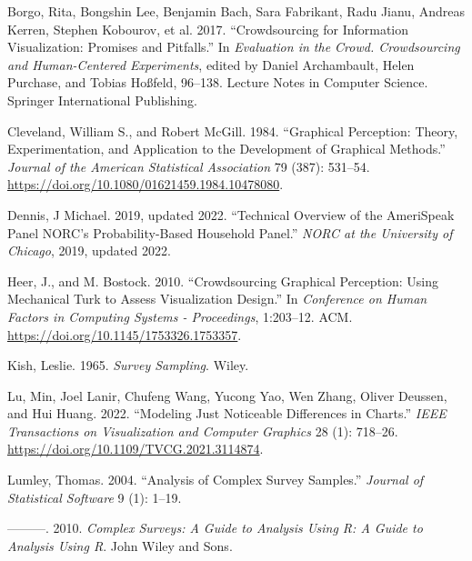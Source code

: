 \documentclass[
]{jds}
\newlength{\cslhangindent}
\newlength{\cslentryspacingunit} %
\newenvironment{CSLReferences}[2] %
 {%
  \setlength{\parindent}{0pt}
  \ifodd #1
  \let\oldpar\par
  \def\par{\hangindent=\cslhangindent\oldpar}
  \fi
  \setlength{\parskip}{#2\cslentryspacingunit}
 }%
 {}
\begin{document}
\hypertarget{refs}{}
\begin{CSLReferences}{1}{0}
\leavevmode{}%
Borgo, Rita, Bongshin Lee, Benjamin Bach, Sara Fabrikant, Radu Jianu,
Andreas Kerren, Stephen Kobourov, et al. 2017. {``Crowdsourcing for
{Information Visualization}: {Promises} and {Pitfalls}.''} In
\emph{Evaluation in the {Crowd}. {Crowdsourcing} and {Human-Centered
Experiments}}, edited by Daniel Archambault, Helen Purchase, and Tobias
Hoßfeld, 96--138. Lecture {Notes} in {Computer Science}. {Springer
International Publishing}.

\leavevmode{}%
Cleveland, William S., and Robert McGill. 1984. {``Graphical Perception:
{Theory}, Experimentation, and Application to the Development of
Graphical Methods.''} \emph{Journal of the American Statistical
Association} 79 (387): 531--54.
\url{https://doi.org/10.1080/01621459.1984.10478080}.

\leavevmode{}%
Dennis, J Michael. 2019, updated 2022. {``Technical Overview of the
{AmeriSpeak} Panel {NORC}'s Probability-Based Household Panel.''}
\emph{NORC at the University of Chicago}, 2019, updated 2022.

\leavevmode{}%
Heer, J., and M. Bostock. 2010. {``Crowdsourcing Graphical Perception:
{Using} Mechanical {Turk} to Assess Visualization Design.''} In
\emph{Conference on {Human Factors} in {Computing Systems} -
{Proceedings}}, 1:203--12. {ACM}.
\url{https://doi.org/10.1145/1753326.1753357}.

\leavevmode{}%
Kish, Leslie. 1965. \emph{Survey {Sampling}}. {Wiley}.

\leavevmode{}%
Lu, Min, Joel Lanir, Chufeng Wang, Yucong Yao, Wen Zhang, Oliver
Deussen, and Hui Huang. 2022. {``Modeling {Just Noticeable Differences}
in {Charts}.''} \emph{IEEE Transactions on Visualization and Computer
Graphics} 28 (1): 718--26.
\url{https://doi.org/10.1109/TVCG.2021.3114874}.

\leavevmode{}%
Lumley, Thomas. 2004. {``Analysis of Complex Survey Samples.''}
\emph{Journal of Statistical Software} 9 (1): 1--19.

\leavevmode{}%
---------. 2010. \emph{Complex Surveys: {A} Guide to Analysis Using {R}:
{A} Guide to Analysis Using {R}}. {John Wiley and Sons}.


\end{CSLReferences}
\end{document}
